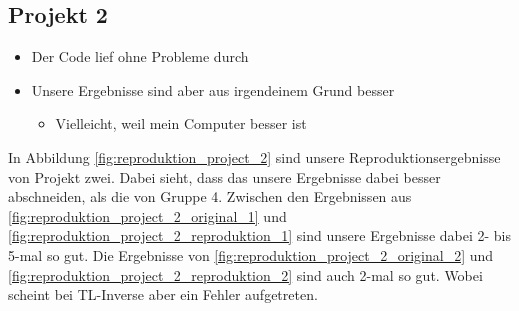     \subsection{Projekt 2}

        \begin{itemize}
            \item Der Code lief ohne Probleme durch
            \item Unsere Ergebnisse sind aber aus irgendeinem Grund besser
            \begin{itemize}
                \item Vielleicht, weil mein Computer besser ist
            \end{itemize}
        \end{itemize}

        In Abbildung \ref{fig:reproduktion_project_2} sind unsere Reproduktionsergebnisse von Projekt zwei. Dabei sieht, dass das unsere Ergebnisse dabei besser abschneiden, als die von Gruppe 4. Zwischen den Ergebnissen aus \ref{fig:reproduktion_project_2_original_1} und \ref{fig:reproduktion_project_2_reproduktion_1} sind unsere Ergebnisse dabei 2- bis 5-mal so gut. Die Ergebnisse von \ref{fig:reproduktion_project_2_original_2} und \ref{fig:reproduktion_project_2_reproduktion_2} sind auch 2-mal so gut. Wobei scheint bei TL-Inverse aber ein Fehler aufgetreten.
        
